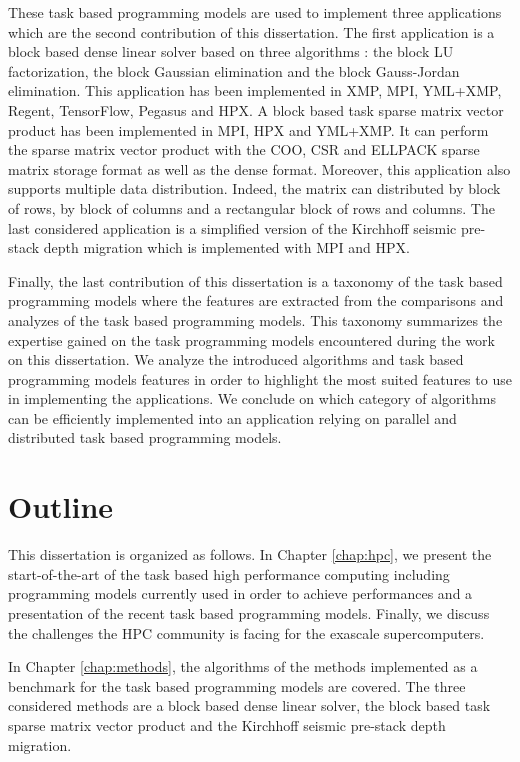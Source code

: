 These task based programming models are used to implement three applications which are the second contribution of this dissertation.
The first application is a block based dense linear solver based on three algorithms : the block LU factorization, the block Gaussian elimination and the block Gauss-Jordan elimination.
This application has been implemented in XMP, MPI, YML+XMP, Regent, TensorFlow, Pegasus and HPX.
A block based task sparse matrix vector product has been implemented in MPI, HPX and YML+XMP.
It can perform the sparse matrix vector product with the COO, CSR and ELLPACK sparse matrix storage format as well as the dense format.
Moreover, this application also supports multiple data distribution.
Indeed, the matrix can distributed by block of rows, by block of columns and a rectangular block of rows and columns.
The last considered application is a simplified version of the Kirchhoff seismic pre-stack depth migration which is implemented with MPI and HPX.

Finally, the last contribution of this dissertation is a taxonomy of the task based programming models where the features are extracted from the comparisons and analyzes of the task based programming models.
This taxonomy summarizes the expertise gained on the task programming models encountered during the work on this dissertation.
We analyze the introduced algorithms and task based programming models features in order to highlight the most suited features to use in implementing the applications.
We conclude on which category of algorithms can be efficiently implemented into an application relying on parallel and distributed task based programming models.

\section{Outline}
This dissertation is organized as follows. In Chapter \ref{chap:hpc}, we present the start-of-the-art of the task based high performance computing including programming models currently used in order to achieve performances and a presentation of the recent task based programming models.
Finally, we discuss the challenges the HPC community is facing for the exascale supercomputers.

In Chapter \ref{chap:methods}, the algorithms of the methods implemented as a benchmark for the task based programming models are covered.
The three considered methods are a block based dense linear solver, the block based task sparse matrix vector product and the Kirchhoff seismic pre-stack depth migration.

